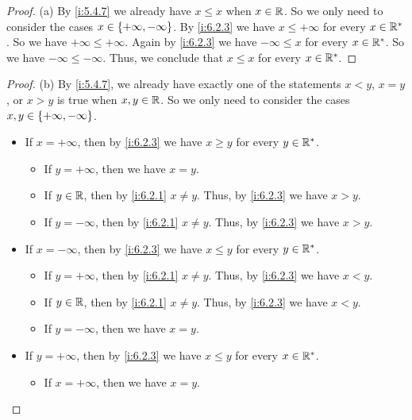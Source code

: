 \begin{proof}{(a)}
  By \cref{i:5.4.7} we already have \(x \leq x\) when \(x \in \mathbb{R}\).
  So we only need to consider the cases \(x \in \left\lbrace+\infty, -\infty\right\rbrace\).
  By \cref{i:6.2.3} we have \(x \leq +\infty\) for every \(x \in \mathbb{R}^*\).
  So we have \(+\infty \leq +\infty\).
  Again by \cref{i:6.2.3} we have \(-\infty \leq x\) for every \(x \in \mathbb{R}^*\).
  So we have \(-\infty \leq -\infty\).
  Thus, we conclude that \(x \leq x\) for every \(x \in \mathbb{R}^*\).
\end{proof}

\begin{proof}{(b)}
  By \cref{i:5.4.7}, we already have exactly one of the statements \(x < y\), \(x = y\), or \(x > y\) is true when \(x, y \in \mathbb{R}\).
  So we only need to consider the cases \(x, y \in \left\lbrace+\infty, -\infty\right\rbrace\).
  \begin{itemize}
    \item If \(x = +\infty\), then by \cref{i:6.2.3} we have \(x \geq y\) for every \(y \in \mathbb{R}^*\).
          \begin{itemize}
            \item If \(y = +\infty\), then we have \(x = y\).
            \item If \(y \in \mathbb{R}\), then by \cref{i:6.2.1} \(x \neq y\).
                  Thus, by \cref{i:6.2.3} we have \(x > y\).
            \item If \(y = -\infty\), then by \cref{i:6.2.1} \(x \neq y\).
                  Thus, by \cref{i:6.2.3} we have \(x > y\).
          \end{itemize}
    \item If \(x = -\infty\), then by \cref{i:6.2.3} we have \(x \leq y\) for every \(y \in \mathbb{R}^*\).
          \begin{itemize}
            \item If \(y = +\infty\), then by \cref{i:6.2.1} \(x \neq y\).
                  Thus, by \cref{i:6.2.3} we have \(x < y\).
            \item If \(y \in \mathbb{R}\), then by \cref{i:6.2.1} \(x \neq y\).
                  Thus, by \cref{i:6.2.3} we have \(x < y\).
            \item If \(y = -\infty\), then we have \(x = y\).
          \end{itemize}
    \item If \(y = +\infty\), then by \cref{i:6.2.3} we have \(x \leq y\) for every \(x \in \mathbb{R}^*\).
          \begin{itemize}
            \item If \(x = +\infty\), then we have \(x = y\).

\end{itemize}
\end{itemize}
\end{proof}
